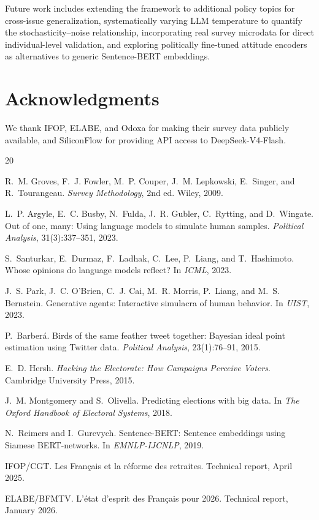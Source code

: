 \documentclass[11pt,a4paper]{article}
\begin{document}
Future work includes extending the framework to additional policy topics for cross-issue generalization, systematically varying LLM temperature to quantify the stochasticity--noise relationship, incorporating real survey microdata for direct individual-level validation, and exploring politically fine-tuned attitude encoders as alternatives to generic Sentence-BERT embeddings.

\section*{Acknowledgments}
We thank IFOP, ELABE, and Odoxa for making their survey data publicly available, and SiliconFlow for providing API access to DeepSeek-V4-Flash.

\begin{thebibliography}{20}

R.~M. Groves, F.~J. Fowler, M.~P. Couper, J.~M. Lepkowski, E.~Singer, and R.~Tourangeau.
\newblock \textit{Survey Methodology}, 2nd ed. Wiley, 2009.

L.~P. Argyle, E.~C. Busby, N.~Fulda, J.~R. Gubler, C.~Rytting, and D.~Wingate.
\newblock Out of one, many: Using language models to simulate human samples.
\newblock \textit{Political Analysis}, 31(3):337--351, 2023.

S.~Santurkar, E.~Durmaz, F.~Ladhak, C.~Lee, P.~Liang, and T.~Hashimoto.
\newblock Whose opinions do language models reflect?
\newblock In \textit{ICML}, 2023.

J.~S. Park, J.~C. O'Brien, C.~J. Cai, M.~R. Morris, P.~Liang, and M.~S. Bernstein.
\newblock Generative agents: Interactive simulacra of human behavior.
\newblock In \textit{UIST}, 2023.

P.~Barber\'a.
\newblock Birds of the same feather tweet together: Bayesian ideal point estimation using Twitter data.
\newblock \textit{Political Analysis}, 23(1):76--91, 2015.

E.~D. Hersh.
\newblock \textit{Hacking the Electorate: How Campaigns Perceive Voters}. Cambridge University Press, 2015.

J.~M. Montgomery and S.~Olivella.
\newblock Predicting elections with big data.
\newblock In \textit{The Oxford Handbook of Electoral Systems}, 2018.

N.~Reimers and I.~Gurevych.
\newblock Sentence-BERT: Sentence embeddings using Siamese BERT-networks.
\newblock In \textit{EMNLP-IJCNLP}, 2019.

IFOP/CGT.
\newblock Les Fran\c{c}ais et la r\'eforme des retraites.
\newblock Technical report, April 2025.

ELABE/BFMTV.
\newblock L'\'etat d'esprit des Fran\c{c}ais pour 2026.
\newblock Technical report, January 2026.

\end{thebibliography}
\end{document}
